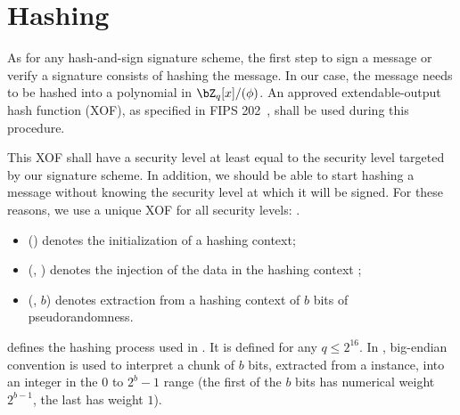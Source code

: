 \section{Hashing} \label{sec:spec:hash}

As for any hash-and-sign signature scheme, the first step to sign a message or verify a signature consists of hashing the message. In our case, the message needs to be hashed into a polynomial in $\bZ_q[x]/(\phi)$. An approved extendable-output hash function (XOF), as specified in FIPS 202~\cite{FIPS}, shall be used during this procedure.

This XOF shall have a security level at least equal to the security level targeted by our signature scheme. In addition, we should be able to start hashing a message without knowing the security level at which it will be signed. For these reasons, we use a unique XOF for all security levels: \shake.
\begin{itemize}
 \item \shakeinit() denotes the initialization of a \shake hashing context;
 \item \shakeinject(\shakectx, \str) denotes the injection of the data \str in the hashing context \shakectx;
 \item \shakeextract(\shakectx, $b$) denotes extraction from a hashing context \shakectx of $b$ bits of pseudorandomness.
\end{itemize}
 
\longhashtopoint defines the hashing process used in \falcon. It is defined for any $q \leq 2^{16}$. In \falcon, big-endian convention is used to interpret a chunk of $b$
bits, extracted from a \shake instance, into an integer in the $0$ to
$2^b-1$ range (the first of the $b$ bits has numerical weight $2^{b-1}$,
the last has weight $1$).

\begin{algorithm}[htb]
\caption{$\hashtopoint(\str, q, n)$}\label{alg:hashtopoint}
\begin{algorithmic}[1]
\State{$\shakectx \gets \shakeinit()$}
\State{$\shakeinject(\shakectx, \str)$}
\label{step:extract}
 \label{alg:hashtopoint:cmp}\label{step:check}
 \label{alg:hashtopoint:mod}
\EndIf
\EndWhile
{}
\end{algorithmic}
\end{algorithm}

